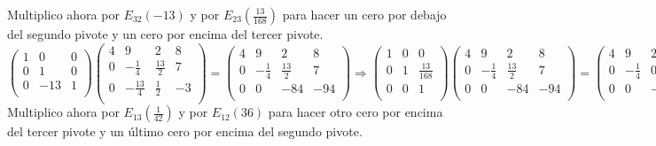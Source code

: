 \documentclass[11pt, a4paper]{article}
\newif\IfInSansMode
\theoremstyle{theorem-style}
\theoremstyle{definition-style}
\theoremstyle{remark-style}
\theoremstyle{example-style}
\begin{document}
Multiplico ahora por $E_{32}(-13)$ y por $E_{23}(\frac{13}{168})$ para hacer un cero por debajo del segundo pivote y un cero por encima del tercer pivote. \\

$\begin{pmatrix}
1 & 0 & 0 \\
0 & 1 & 0 \\
0 & -13 & 1 \\
\end{pmatrix} 
\begin{pmatrix}
4 & 9 & 2 & 8\\
0 & -\frac{1}{4} & \frac{13}{2} & 7\\
0 & -\frac{13}{4} & \frac{1}{2} & -3 \\
\end{pmatrix}=
\begin{pmatrix}
4 & 9 & 2 & 8\\
0 & -\frac{1}{4} & \frac{13}{2} & 7\\
0 & 0 & -84 & -94 \\
\end{pmatrix} \Longrightarrow
\begin{pmatrix}
1 & 0 & 0 \\
0 & 1 & \frac{13}{168} \\
0 & 0 & 1 \\
\end{pmatrix} 
\begin{pmatrix}
4 & 9 & 2 & 8\\
0 & -\frac{1}{4} & \frac{13}{2} & 7\\
0 & 0 & -84 & -94 \\
\end{pmatrix} = 
\begin{pmatrix}
4 & 9 & 2 & 8\\
0 & -\frac{1}{4} & 0 & -\frac{23}{84}\\
0 & 0 & -84 & -94 \\
\end{pmatrix}$ \\

Multiplico ahora por $E_{13}(\frac{1}{42})$ y por $E_{12}(36)$ para hacer otro cero por encima del tercer pivote y un último cero por encima del segundo pivote. \\
\end{document}
